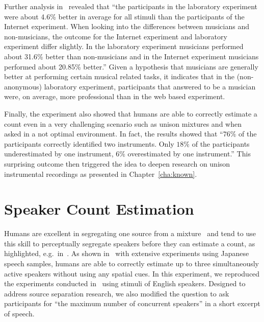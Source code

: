 Further analysis in~\cite{schoeffler13} revealed that ``the participants in the laboratory experiment were about 4.6\% better in average for all stimuli than the participants of the Internet experiment. When looking into the differences between musicians and non-musicians, the outcome for the Internet experiment and laboratory experiment differ slightly. In the laboratory experiment musicians performed about 31.6\% better than non-musicians and in the Internet experiment musicians performed about 20.85\% better.''
Given a hypothesis that musicians are generally better at performing  certain musical related tasks, it indicates that in the (non-anonymous) laboratory experiment, participants that answered to be a musician were, on average, more professional than in the web based experiment.
\par
Finally, the experiment also showed that humans are able to correctly estimate a count even in a very challenging scenario such as unison mixtures and when asked in a not optimal environment.
In fact, the results showed that ``$76\%$ of the participants correctly identified two instruments. Only $18\%$ of the participants underestimated by one instrument, $6\%$ overestimated by one instrument.''
This surprising outcome then triggered the idea to deepen research on  unison instrumental recordings as presented in Chapter~\ref{cha:known}.

\section{Speaker Count Estimation}%
\label{sec:count_experiment}


Humans are excellent in segregating one source from a mixture~\cite{bregman90} and tend to use this skill to perceptually segregate speakers before they can estimate a count, as highlighted, e.g.\ in~\cite{kawashima15}.
As shown in~\cite{kashino96, kawashima15} with extensive experiments using Japanese speech samples, humans are able to correctly estimate up to three simultaneously active speakers without using any spatial cues.
In this experiment, we reproduced the experiments conducted in~\cite{kawashima15, kashino96} using stimuli of English speakers.
Designed to address source separation research, we also modified the question to ask participants for ``the maximum number of concurrent speakers'' in a short excerpt of speech.

